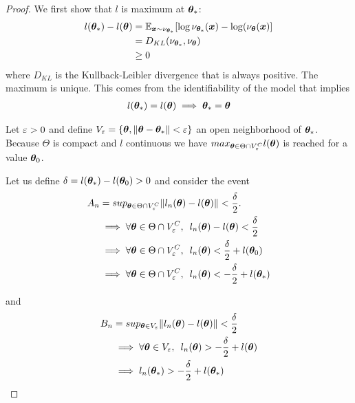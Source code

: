 \begin{proof}
  We first show that $l$ is maximum at $\boldsymbol{\theta}_*$:
  \begin{align}
    l(\boldsymbol{\theta}_*) - l(\boldsymbol{\theta}) &= \mathbb{E}_{\boldsymbol{x} \sim \nu_{\boldsymbol{\theta}_*}}[\log \nu_{\boldsymbol{\theta}_*}(\boldsymbol{x}) - \log(\nu_{\boldsymbol{\theta}}(\boldsymbol{x})] \\
                            &= D_{KL}(\nu_{\boldsymbol{\theta}_*}, \nu_{\boldsymbol{\theta}}) \\ \label{kl-likelihood}
                            &\geq 0
  \end{align}
  where $D_{KL}$ is the Kullback-Leibler divergence that is always positive.
  The maximum is unique. This comes from the identifiability of the model that
  implies
  \begin{align}
    l(\boldsymbol{\theta}_*) = l(\boldsymbol{\theta}) \implies \boldsymbol{\theta}_* = \boldsymbol{\theta}
  \end{align}

  Let $\varepsilon > 0$ and define $V_{\varepsilon} = \{\boldsymbol{\theta}, \|\boldsymbol{\theta} - \boldsymbol{\theta}_*\| <
  \varepsilon\}$ an open neighborhood of $\boldsymbol{\theta}_*$.
  Because $\Theta$ is compact and $l$ continuous we have $max_{\boldsymbol{\theta} \in \Theta
    \cap V_{\varepsilon}^C} l(\boldsymbol{\theta})$ is reached for a value $\boldsymbol{\theta}_0$.
  
  Let us define $\delta = l(\boldsymbol{\theta}_*) - l(\boldsymbol{\theta}_0) > 0$ and consider the event
  \begin{align}
    A_n &= sup_{\boldsymbol{\theta} \in \Theta \cap V_{\varepsilon}^C} \|l_n(\boldsymbol{\theta}) - l(\boldsymbol{\theta})\| < \frac{\delta}{2}. \\
        &\implies \forall \boldsymbol{\theta} \in \Theta \cap V_{\varepsilon}^C,  \enspace l_n(\boldsymbol{\theta}) - l(\boldsymbol{\theta}) < \frac{\delta}{2} \\
        &\implies \forall \boldsymbol{\theta} \in \Theta \cap V_{\varepsilon}^C,  \enspace l_n(\boldsymbol{\theta}) < \frac{\delta}{2} + l(\boldsymbol{\theta}_0) \\
        &\implies \forall \boldsymbol{\theta} \in \Theta \cap V_{\varepsilon}^C,  \enspace l_n(\boldsymbol{\theta}) < -\frac{\delta}{2} + l(\boldsymbol{\theta}_*)
  \end{align}

  and 
  \begin{align}
    B_n &= sup_{\boldsymbol{\theta} \in V_{\varepsilon}} \|l_n(\boldsymbol{\theta}) - l(\boldsymbol{\theta})\| < \frac{\delta}{2} \\
        &\implies \forall \boldsymbol{\theta} \in V_{\varepsilon}, \enspace l_n(\boldsymbol{\theta}) > -\frac{\delta}{2} + l(\boldsymbol{\theta}) \\
        &\implies l_n(\boldsymbol{\theta}_*) > -\frac{\delta}{2} + l(\boldsymbol{\theta}_*) \\
  \end{align}


\end{proof}
